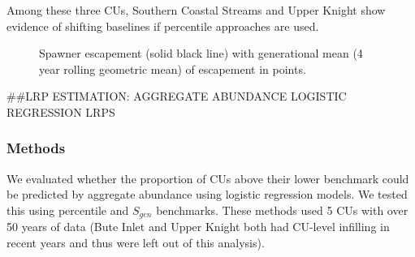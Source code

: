\documentclass[11pt]{book}
\begin{document}
Among these three CUs, Southern Coastal Streams and Upper Knight show evidence of shifting baselines if percentile approaches are used.
\begin{figure}[htb]

{\centering {} 

}

\caption{Spawner escapement (solid black line) with generational mean (4 year rolling geometric mean) of escapement in points.}\label{fig:chum-perc-status-static}
\end{figure}
\#\#LRP ESTIMATION: AGGREGATE ABUNDANCE LOGISTIC REGRESSION LRPS

\hypertarget{methods-5}{%
\subsubsection{Methods}\label{methods-5}}

We evaluated whether the proportion of CUs above their lower benchmark could be predicted by aggregate abundance using logistic regression models. We tested this using percentile and \(S_{gen}\) benchmarks. These methods used 5 CUs with over 50 years of data (Bute Inlet and Upper Knight both had CU-level infilling in recent years and thus were left out of this analysis).
\end{document}
